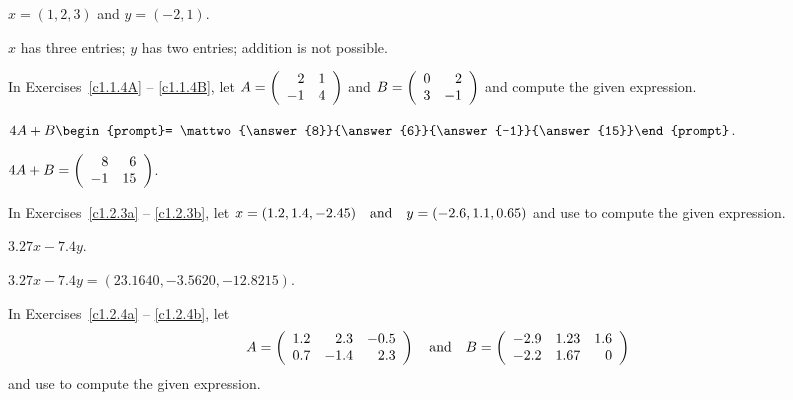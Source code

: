\documentclass{ximera}
\begin{document}
\begin{exercise}\label{c1.1.3c}
  $x=(1,2,3)$ and $y=(-2,1)$.
  

\begin{solution}
\ans $x$ has three entries; $y$ has two entries; addition is not possible.

\end{solution}
\end{exercise}





\problemlabel

\noindent In Exercises~\ref{c1.1.4A} -- \ref{c1.1.4B}, let
$A=\left(\begin{array}{rr} 2 & 1\\ -1 &4\end{array}\right)$ and $B=\left(\begin{array}{rr} 0 & 2\\ 3 &-1\end{array}\right)$ and compute the given 
expression.


\begin{exercise}\label{c1.1.4A}
  $4A+B\begin{prompt}= \mattwo{\answer{8}}{\answer{6}}{\answer{-1}}{\answer{15}}\end{prompt}$.

\begin{solution}
\ans $4A + B = \left(\begin{array}{rr} 8 & 6\\ -1 &15\end{array}\right)$.


\end{solution}
\end{exercise}





\matlabproblemlabel

\noindent In Exercises~\ref{c1.2.3a} -- \ref{c1.2.3b}, let 
$x=(1.2,1.4,-2.45) \quad\mbox{and}\quad y=(-2.6,1.1,0.65)$ and use \Matlab to compute the 
given expression.


\begin{computerExercise}  \label{c1.2.3a}
$3.27x-7.4y$.

\begin{solution}
\ans $3.27x - 7.4y = (23.1640, -3.5620, -12.8215)$.

\end{solution}
\end{computerExercise}





\matlabproblemlabel

\noindent In Exercises~\ref{c1.2.4a} -- \ref{c1.2.4b}, let 
\[
A = \left(\begin{array}{rrr} 1.2 & 2.3 & -0.5\\ 0.7 & -1.4 & 2.3
\end{array}\right) \quad\mbox{and}\quad
B = \left(\begin{array}{rrr} -2.9 & 1.23 & 1.6\\ -2.2 & 1.67 & 0
\end{array}\right)
\]
and use \Matlab to compute the given expression.
\end{document}
